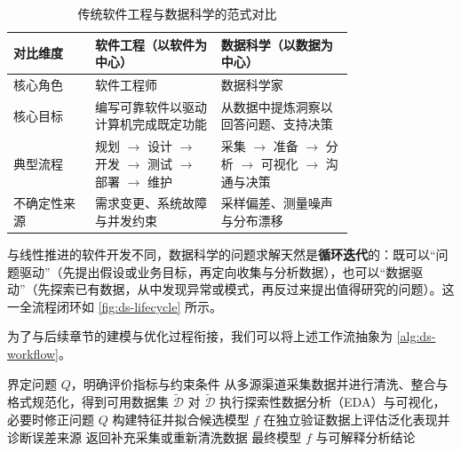 \begin{table}[htbp]
  \centering\small
  \caption{传统软件工程与数据科学的范式对比}\label{tab:cs-vs-ds}
  \begin{tabular}{@{}l>{\raggedright\arraybackslash}p{0.37\linewidth}>{\raggedright\arraybackslash}p{0.39\linewidth}@{}}
    \toprule
    对比维度 & 软件工程（以软件为中心） & 数据科学（以数据为中心） \\
    \midrule
    核心角色 & 软件工程师 & 数据科学家 \\
    核心目标 & 编写可靠软件以驱动计算机完成既定功能 & 从数据中提炼洞察以回答问题、支持决策 \\
    典型流程 & 规划 $\to$ 设计 $\to$ 开发 $\to$ 测试 $\to$ 部署 $\to$ 维护 & 采集 $\to$ 准备 $\to$ 分析 $\to$ 可视化 $\to$ 沟通与决策 \\
    不确定性来源 & 需求变更、系统故障与并发约束 & 采样偏差、测量噪声与分布漂移 \\
    \bottomrule
  \end{tabular}
\end{table}

与线性推进的软件开发不同，数据科学的问题求解天然是\textbf{循环迭代}的：既可以“问题驱动”（先提出假设或业务目标，再定向收集与分析数据），也可以“数据驱动”（先探索已有数据，从中发现异常或模式，再反过来提出值得研究的问题）。这一全流程闭环如 \cref{fig:ds-lifecycle} 所示。


为了与后续章节的建模与优化过程衔接，我们可以将上述工作流抽象为 \cref{alg:ds-workflow}。

\begin{algorithm}[数据科学迭代求解流程]\label{alg:ds-workflow}
\begin{algsteps}
  \State 界定问题 $Q$，明确评价指标与约束条件
  \State 从多源渠道采集数据并进行清洗、整合与格式规范化，得到可用数据集 $\tilde{\mathcal{D}}$
  \State 对 $\tilde{\mathcal{D}}$ 执行探索性数据分析（EDA）与可视化，必要时修正问题 $Q$
    \State 构建特征并拟合候选模型 $f$
    \State 在独立验证数据上评估泛化表现并诊断误差来源
      \State 返回补充采集或重新清洗数据
    \EndIf
  \EndWhile
  \State \Return 最终模型 $f$ 与可解释分析结论
\end{algsteps}
\end{algorithm}

